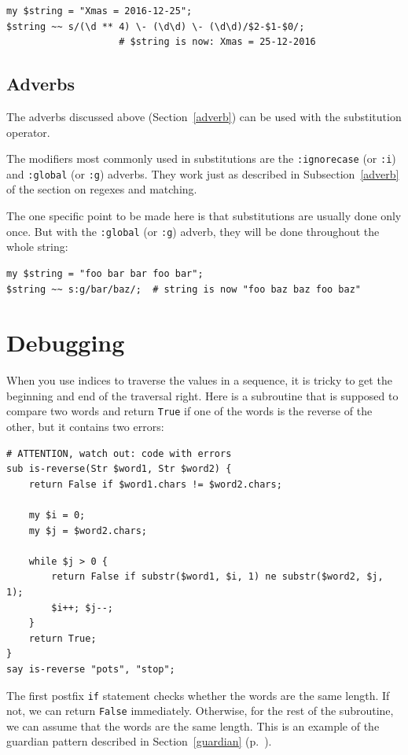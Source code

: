 \begin{verbatim}
my $string = "Xmas = 2016-12-25";
$string ~~ s/(\d ** 4) \- (\d\d) \- (\d\d)/$2-$1-$0/;
                    # $string is now: Xmas = 25-12-2016
\end{verbatim}
%

\subsection{Adverbs}
\label{regex_adverbs}

The adverbs discussed above (Section~\ref{adverb}) can be 
used with the substitution operator. 

The modifiers most commonly used in substitutions are the 
{\tt :ignorecase} (or {\tt :i}) and {\tt :global} (or 
{\tt :g}) adverbs. They work just as described in 
Subsection~\ref{adverb} of the section on regexes 
and matching. 

The one specific point to be made here is that substitutions 
are usually done only once. But with the {\tt :global} (or 
{\tt :g}) adverb, they will be done throughout the whole 
string:

\begin{verbatim}
my $string = "foo bar bar foo bar";
$string ~~ s:g/bar/baz/;  # string is now "foo baz baz foo baz"                    
\end{verbatim}
%


\section{Debugging}

When you use indices to traverse the values in a sequence,
it is tricky to get the beginning and end of the traversal
right.  Here is a subroutine that is supposed to compare two
words and return {\tt True} if one of the words is the reverse
of the other, but it contains two errors:

\begin{verbatim}
# ATTENTION, watch out: code with errors
sub is-reverse(Str $word1, Str $word2) {
    return False if $word1.chars != $word2.chars;
    
    my $i = 0;
    my $j = $word2.chars;

    while $j > 0 {
        return False if substr($word1, $i, 1) ne substr($word2, $j, 1);
        $i++; $j--;
    }
    return True;
}
say is-reverse "pots", "stop";

\end{verbatim}
%
The first postfix {\tt if} statement checks whether the words 
are the same length.  If not, we can return {\tt False} 
immediately. Otherwise, for the rest of the subroutine, 
we can assume that the words are the same length.  
This is an example of the guardian pattern described 
in Section~\ref{guardian} (p.~\pageref{guardian}).

